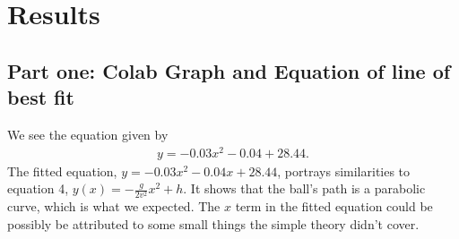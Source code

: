 \documentclass{report}
\begin{document}
    \bigbreak \noindent 
    \section{Results}
    \bigbreak \noindent 
    \subsection{Part one: Colab Graph and Equation of line of best fit}
    \bigbreak \noindent 
    \bigbreak \noindent 
    We see the equation given by 
    \begin{align*}
        y = -0.03x^{2} -0.04 + 28.44
    .\end{align*}
    \bigbreak \noindent 
    The fitted equation, \(y = -0.03x^2 - 0.04x + 28.44\), portrays similarities to equation 4, \(y(x) = -\frac{g}{2v^2} x^2 + h\). It shows that the ball's path is a parabolic curve, which is what we expected. The \(x\) term in the fitted equation could be possibly be attributed to some small things the simple theory didn't cover. 

    \bigbreak \noindent 
\end{document}
